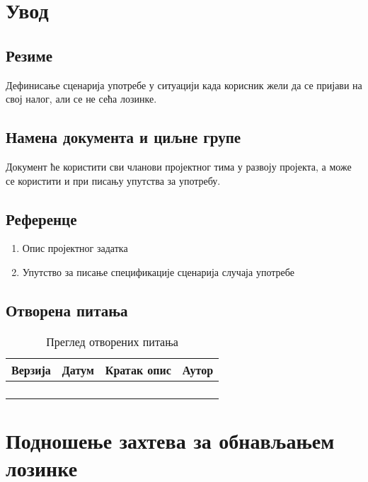 \section{Увод}

\subsection{Резиме}
Дефинисање сценарија употребе у ситуацији када корисник жели да се пријави на свој налог, али
се не сећа лозинке.

\subsection{Намена документа и циљне групе}
Документ ће користити сви чланови пројектног тима у развоју пројекта, а може се 
користити и при писању упутства за употребу.

\subsection{Референце}
\begin{enumerate}
	\item Опис пројектног задатка
	\item Упутство за писање спецификације сценарија случаја употребе
\end{enumerate}

\subsection{Отворена питања}
\begin{table}[h!]
\centering
	
	\begin{tabu}{ || X[l] | X[l] | X[l] | X[l] || }
	\hline
	\textbf{Верзија} & \textbf{Датум} & \textbf{Кратак опис} & \textbf{Аутор} \\
	\hline
	\hline
	& & &\\
	\hline
	& & &\\
	\hline
	& & &\\
	\hline
	& & &\\
	\hline
	\end{tabu}
	\caption{Преглед отворених питања}
	\label{table:2}
		
\end{table}



\section{Подношење захтева за обнављањем лозинке}

